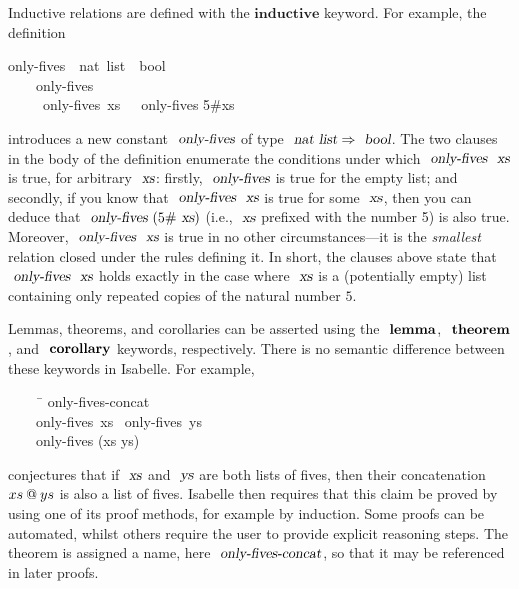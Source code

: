 Inductive relations are defined with the $\mathbf{inductive}$ keyword.
For example, the definition
\begin{isabelle}
 only-fives\ {\isacharcolon}{\isacharcolon}\ {\isachardoublequoteopen}nat\ list\ {\isasymRightarrow}\ bool{\isachardoublequoteclose}\ \\
~~~~{\isachardoublequoteopen}only-fives\ {\isacharbrackleft}{\isacharbrackright}{\isachardoublequoteclose}\ {\isacharbar}\\
~~~~{\isachardoublequoteopen}{\isasymlbrakk}\ only-fives\ xs\ {\isasymrbrakk}\ {\isasymLongrightarrow}\ only-fives {\isacharparenleft}5\#xs{\isacharparenright}{\isachardoublequoteclose}
\end{isabelle}
\noindent
introduces a new constant $\isa{only-fives}$ of type $\isa{nat list} \Rightarrow \isa{bool}$.
The two clauses in the body of the definition enumerate the conditions under which $\isa{only-fives}\ \isa{xs}$ is true, for arbitrary $\isa{xs}$: firstly, $\isa{only-fives}$ is true for the empty list; and secondly, if you know that $\isa{only-fives}\ \isa{xs}$ is true for some $\isa{xs}$, then you can deduce that $\isa{only-fives}\ (5\#\isa{xs})$ (i.e., $\isa{xs}$ prefixed with the number 5) is also true.
Moreover, $\isa{only-fives}\ \isa{xs}$ is true in no other circumstances---it is the \emph{smallest} relation closed under the rules defining it.
In short, the clauses above state that $\isa{only-fives}\ \isa{xs}$ holds exactly in the case where $\isa{xs}$ is a (potentially empty) list containing only repeated copies of the natural number $5$.

Lemmas, theorems, and corollaries can be asserted using the $\isacommand{lemma}$, $\isacommand{theorem}$, and $\isacommand{corollary}$ keywords, respectively.
There is no semantic difference between these keywords in Isabelle.
For example,
\begin{isabelle}
~~~~\ \=\kill
{} only-fives-concat{\isacharcolon}\\
~~~~\>only-fives\ xs \ only-fives\ ys\\
~~~~\>only-fives (xs \isacharat ys)
\end{isabelle}
\noindent
conjectures that if $\isa{xs}$ and $\isa{ys}$ are both lists of fives, then their concatenation $xs \mathbin{\emph{$@$}} ys$ is also a list of fives.
Isabelle then requires that this claim be proved by using one of its proof methods, for example by induction.
Some proofs can be automated, whilst others require the user to provide explicit reasoning steps.
The theorem is assigned a name, here $\isa{only-fives-concat}$, so that it may be referenced in later proofs.

